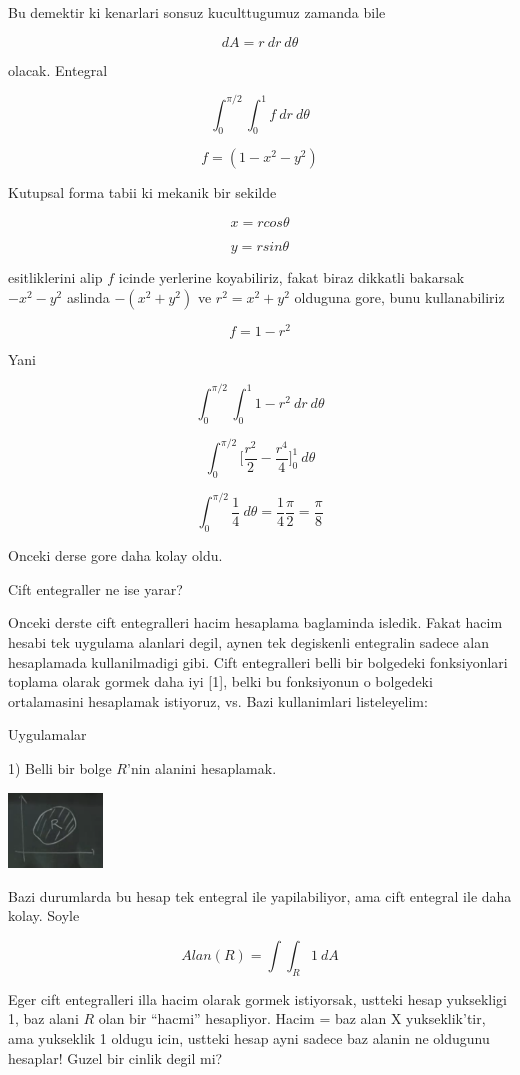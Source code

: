 \documentclass[12pt,fleqn]{article}\usepackage{../common}
\begin{document}
Bu demektir ki kenarlari sonsuz kuculttugumuz zamanda bile 

\[ dA = r \ dr \ d\theta \]

olacak. Entegral

\[ \int_0^{\pi/2} \int_0^1  f \ dr \ d\theta\]

\[ f =  (1-x^2-y^2)\]

Kutupsal forma tabii ki mekanik bir sekilde

\[ x = rcos\theta \]

\[ y = rsin\theta \]

esitliklerini alip $f$ icinde yerlerine koyabiliriz, fakat biraz dikkatli
bakarsak $-x^2-y^2$ aslinda $-(x^2+y^2)$ ve $r^2=x^2+y^2$ olduguna gore,
bunu kullanabiliriz

\[ f =   1-r^2 \]

Yani

\[ \int_0^{\pi/2} \int_0^1  1-r^2 \ dr \ d\theta\]


\[ \int_0^{\pi/2}  \bigg[ \frac{r^2}{2} - \frac{r^4}{4} \bigg]_0^1 \ d\theta\]


\[ \int_0^{\pi/2}  \frac{1}{4} \ d\theta = \frac{1}{4} \frac{\pi}{2} =
\frac{\pi}{8}
\]

Onceki derse gore daha kolay oldu. 

Cift entegraller ne ise yarar? 

Onceki derste cift entegralleri hacim hesaplama baglaminda isledik. Fakat
hacim hesabi tek uygulama alanlari degil, aynen tek degiskenli entegralin
sadece alan hesaplamada kullanilmadigi gibi. Cift entegralleri
belli bir bolgedeki fonksiyonlari toplama olarak gormek daha iyi [1], belki bu
fonksiyonun o bolgedeki ortalamasini hesaplamak istiyoruz, vs. Bazi
kullanimlari listeleyelim:

Uygulamalar 

1) Belli bir bolge $R$'nin alanini hesaplamak. 

\includegraphics[height=2cm]{17_3.png}

Bazi durumlarda bu hesap tek entegral ile yapilabiliyor, ama cift entegral
ile daha kolay. Soyle

\[ Alan(R) = \int \int_R 1 \ dA \]

Eger cift entegralleri illa hacim olarak gormek istiyorsak, ustteki hesap
yuksekligi 1, baz alani $R$ olan bir ``hacmi'' hesapliyor. Hacim = baz alan
X yukseklik'tir, ama yukseklik 1 oldugu icin, ustteki hesap ayni sadece baz
alanin ne oldugunu hesaplar! Guzel bir cinlik degil mi?
\end{document}

